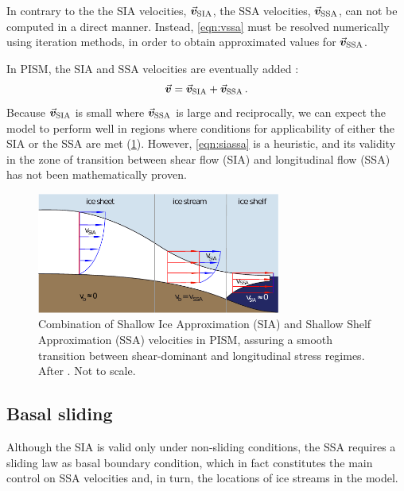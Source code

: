 \documentclass{article}
\newcommand{\vect}[1]{\va*{#1}} %
\newcommand{\vv}[0]{\vect{v}}           %
\newcommand{\vsia}[0]{\vv_{\mathrm{SIA}}}   %
\newcommand{\vssa}[0]{\vv_{\mathrm{SSA}}}   %
\begin{document}
In contrary to the the SIA velocities, $\vsia$, the SSA velocities, $\vssa$,
can not be computed in a direct manner. Instead, \cref{eqn:vssa} must be
resolved numerically using iteration methods, in order to obtain
approximated values for $\vssa$.

In PISM, the SIA and SSA velocities are eventually added
\citep[\cref{fig:model-siassa};][Eq.~15]{Winkelmann.etal.2011}:
\begin{equation}
    \label{eqn:siassa}
    \vv = \vsia + \vssa \,.
\end{equation}
Because $\vsia$ is small where $\vssa$ is large and
reciprocally, we can expect the model to perform well in regions where
conditions for applicability of either the SIA or the SSA are met
(\cref{fig:model-siassa}). However,
\cref{eqn:siassa} is a heuristic, and its validity in the zone of
transition between shear flow (SIA) and longitudinal flow (SSA) has not been
mathematically proven.

\begin{figure}
  \centering
  \includegraphics[width=80mm]{model-siassa}
  \caption{Combination of Shallow Ice Approximation (SIA) and Shallow Shelf
           Approximation (SSA) velocities in PISM, assuring a smooth transition
           between shear-dominant and longitudinal stress regimes. After
           \citet[Fig.~1]{Winkelmann.etal.2011}. Not to scale.}
  \label{fig:model-siassa}
\end{figure}


\subsection{Basal sliding}

Although the SIA is valid only under non-sliding conditions, the SSA requires
a sliding law as basal boundary condition, which in fact constitutes the main
control on SSA velocities and, in turn, the locations of ice streams in the
model.
\end{document}
